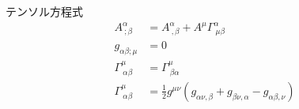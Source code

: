 \documentclass[uplatex,dvipdfmx,a4paper,11pt]{jlreq}
\theoremstyle{definition}
\begin{document}
\begin{itembox}[l]{テンソル方程式}
  \begin{align}
    A^\alpha_{\ ;\beta}        & = A^\alpha_{\ ,\beta} + A^\mu\Gamma^\alpha_{\ \mu\beta}                                  \\
    g_{\alpha\beta;\mu}        & = 0                                                                                      \\
    \Gamma^\mu_{\ \alpha\beta} & = \Gamma^\mu_{\ \beta\alpha}                                                             \\
    \Gamma^\mu_{\ \alpha\beta} & = \frac{1}{2}g^{\mu\nu}(g_{\alpha\nu,\beta} + g_{\beta\nu,\alpha} - g_{\alpha\beta,\nu})
  \end{align}
\end{itembox}
\end{document}

